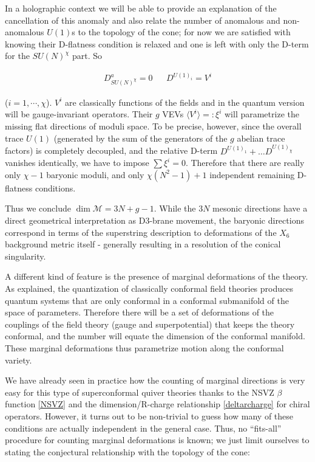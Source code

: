 In a holographic context we will be able to provide an explanation of the cancellation of this anomaly and also relate the number of anomalous and non-anomalous $U(1)$s to the topology of the cone; for now we are satisfied with knowing their D-flatness condition is relaxed and one is left with only the D-term for the $SU(N)^\chi$ part. So

\begin{align}
	D^a_{SU(N)^\chi} = 0 && D^{U(1)_i} = V^i
	\label{}
\end{align}

($i=1,\cdots,\chi$). $V^i$ are classically functions of the fields and in the quantum version will be gauge-invariant operators. Their $g$ VEVs $\langle V^i \rangle =: \xi^i$ will parametrize the missing flat directions of moduli space. To be precise, however, since the overall trace $U(1)$ (generated by the sum of the generators of the $g$ abelian trace factors) is completely decoupled, and the relative D-term $D^{U(1)_1} + \ldots D^{U(1)_\chi}$ vanishes identically, we have to impose $\sum \xi^i = 0$. Therefore that there are really only $\chi-1$ baryonic moduli, and only $\chi(N^2-1)+1$ independent remaining D-flatness conditions.

Thus we conclude $\dim \mathcal M = 3N + g - 1$. While the $3N$ mesonic directions have a direct geometrical interpretation as D3-brane movement, the baryonic directions correspond in terms of the superstring description to deformations of the $X_6$ background metric itself - generally resulting in a resolution of the conical singularity.

A different kind of feature is the presence of marginal deformations of the theory. As explained, the quantization of classically conformal field theories produces quantum systems that are only conformal in a conformal submanifold of the space of parameters. Therefore there will be a set of deformations of the couplings of the field theory (gauge and superpotential) that keeps the theory conformal, and the number will equate the dimension of the conformal manifold. These marginal deformations thus parametrize motion along the conformal variety. 

We have already seen in practice how the counting of marginal directions is very easy for this type of superconformal quiver theories thanks to the NSVZ $\beta$ function \eqref{NSVZ} and the dimension/R-charge relationship \eqref{deltarcharge} for chiral operators. However, it turns out to be non-trivial to guess how many of these conditions are actually independent in the general case. Thus, no ``fits-all'' procedure for counting marginal deformations is known; we just limit ourselves to stating the conjectural relationship with the topology of the cone:

